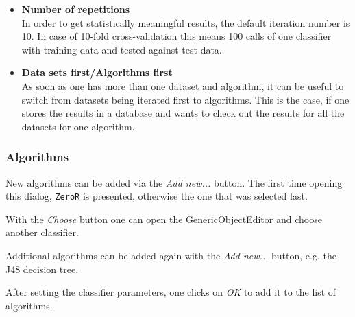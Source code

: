 \documentclass[a4paper]{article}
\begin{document}
\begin{itemize}
   \item \textbf{Number of repetitions} \\
      In order to get statistically meaningful results, the default iteration number is 10. In case of 10-fold cross-validation this means 100 calls of one classifier with training data and tested against test data. 

   \item \textbf{Data sets first/Algorithms first} \\
      As soon as one has more than one dataset and algorithm, it can be useful to switch from datasets being iterated first to algorithms. This is the case, if one stores the results in a database and wants to check out the results for all the datasets for one algorithm. 
\end{itemize}


\subsubsection{Algorithms}

New algorithms can be added via the \textit{Add new...} button. The first time opening this dialog, \texttt{ZeroR} is presented, otherwise the one that was selected last.

\begin{center}
\end{center}


With the \textit{Choose} button one can open the GenericObjectEditor and choose another classifier.

\begin{center}
\end{center}


Additional algorithms can be added again with the \textit{Add new...} button, e.g. the J48 decision tree.

\begin{center}
\end{center}


After setting the classifier parameters, one clicks on \textit{OK} to add it to the list of algorithms.

\begin{center}
\end{center}
\end{document}
